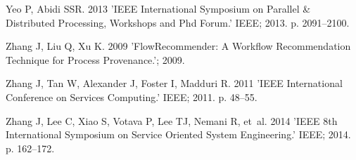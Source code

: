 \documentclass{doublecol-new}
\def\newblock{\hskip .11em plus .33em minus .07em}
\theoremstyle{TH}{
\newtheorem{lemma}{Lemma}
\newtheorem{theorem}[lemma]{Theorem}
\newtheorem{corrolary}[lemma]{Corrolary}
\newtheorem{conjecture}[lemma]{Conjecture}
\newtheorem{proposition}[lemma]{Proposition}
\newtheorem{claim}[lemma]{Claim}
\newtheorem{stheorem}[lemma]{Wrong Theorem}
\newtheorem{algorithm}{Algorithm}
}
\theoremstyle{THrm}{
\newtheorem{definition}{Definition}[section]
\newtheorem{question}{Question}[section]
\newtheorem{remark}{Remark}
\newtheorem{scheme}{Scheme}
}
\theoremstyle{THhit}{
\newtheorem{case}{Case}[section]
}
\begin{document}
\begin{thebibliography}{10}

Yeo P, Abidi SSR. {2013} 'IEEE International Symposium on Parallel \& Distributed
Processing, Workshops and Phd Forum.' IEEE; 2013. p. 2091--2100.


Zhang J, Liu Q, Xu K. {2009} 'FlowRecommender: A Workflow Recommendation Technique for
Process Provenance.'; 2009. 

	
Zhang J, Tan W, Alexander J, Foster I, Madduri R. {2011} 'IEEE International Conference on Services Computing.' IEEE;
2011. p. 48--55.
	
	
Zhang J, Lee C, Xiao S, Votava P, Lee TJ, Nemani R, et~al. {2014} 'IEEE 8th International Symposium on Service Oriented System
Engineering.' IEEE; 2014. p. 162--172.
	
	
 \end{thebibliography}
\end{document}
